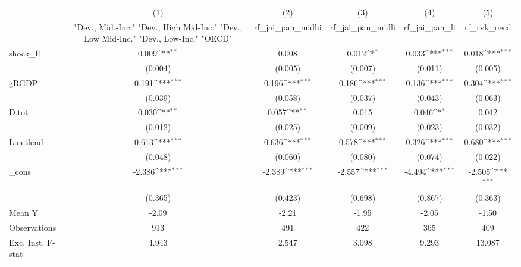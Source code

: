 {
\def\sym#1{\ifmmode^{#1}\else\(^{#1}\)\fi}
\begin{tabular}{l*{5}{c}}
\toprule
            &\multicolumn{1}{c}{(1)}&\multicolumn{1}{c}{(2)}&\multicolumn{1}{c}{(3)}&\multicolumn{1}{c}{(4)}&\multicolumn{1}{c}{(5)}\\
            &\multicolumn{1}{c}{ "Dev., Mid.-Inc." "Dev., High Mid-Inc." "Dev., Low Mid-Inc." "Dev., Low-Inc." "OECD" }&\multicolumn{1}{c}{rf\_jai\_pan\_midhi}&\multicolumn{1}{c}{rf\_jai\_pan\_midli}&\multicolumn{1}{c}{rf\_jai\_pan\_li}&\multicolumn{1}{c}{rf\_rvk\_oecd}\\
\midrule
shock\_f1    &       0.009\sym{**} &       0.008         &       0.012\sym{*}  &       0.033\sym{***}&       0.018\sym{***}\\
            &     (0.004)         &     (0.005)         &     (0.007)         &     (0.011)         &     (0.005)         \\
\addlinespace
gRGDP       &       0.191\sym{***}&       0.196\sym{***}&       0.186\sym{***}&       0.136\sym{***}&       0.304\sym{***}\\
            &     (0.039)         &     (0.058)         &     (0.037)         &     (0.043)         &     (0.063)         \\
\addlinespace
D.tot       &       0.030\sym{**} &       0.057\sym{**} &       0.015         &       0.046\sym{*}  &       0.042         \\
            &     (0.012)         &     (0.025)         &     (0.009)         &     (0.023)         &     (0.032)         \\
\addlinespace
L.netlend   &       0.613\sym{***}&       0.636\sym{***}&       0.578\sym{***}&       0.326\sym{***}&       0.680\sym{***}\\
            &     (0.048)         &     (0.060)         &     (0.080)         &     (0.074)         &     (0.022)         \\
\addlinespace
\_cons      &      -2.386\sym{***}&      -2.389\sym{***}&      -2.557\sym{***}&      -4.494\sym{***}&      -2.505\sym{***}\\
            &     (0.365)         &     (0.423)         &     (0.698)         &     (0.867)         &     (0.363)         \\
\midrule
Mean Y      &       -2.09         &       -2.21         &       -1.95         &       -2.05         &       -1.50         \\
Observations&         913         &         491         &         422         &         365         &         409         \\
Exc. Inst. F-stat&       4.943         &       2.547         &       3.098         &       9.293         &      13.087         \\
\bottomrule
\end{tabular}
}
